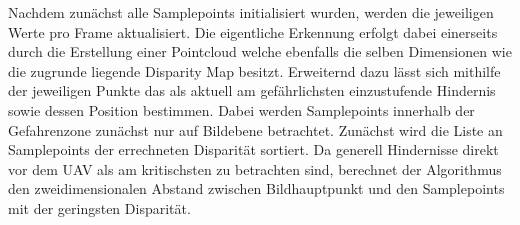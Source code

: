 \noindent
Nachdem zunächst alle Samplepoints initialisiert wurden, werden die jeweiligen Werte pro Frame aktualisiert. Die eigentliche Erkennung erfolgt dabei einerseits durch die Erstellung einer Pointcloud welche ebenfalls die selben Dimensionen wie die zugrunde liegende Disparity Map besitzt. Erweiternd dazu lässt sich mithilfe der jeweiligen Punkte das als aktuell am gefährlichsten einzustufende Hindernis sowie dessen Position bestimmen. Dabei werden Samplepoints innerhalb der Gefahrenzone zunächst nur auf Bildebene betrachtet.
Zunächst wird die Liste an Samplepoints der errechneten Disparität sortiert.
Da generell Hindernisse direkt vor dem UAV als am kritischsten zu betrachten sind, berechnet der Algorithmus den zweidimensionalen Abstand zwischen Bildhauptpunkt und den Samplepoints mit der geringsten Disparität. 
